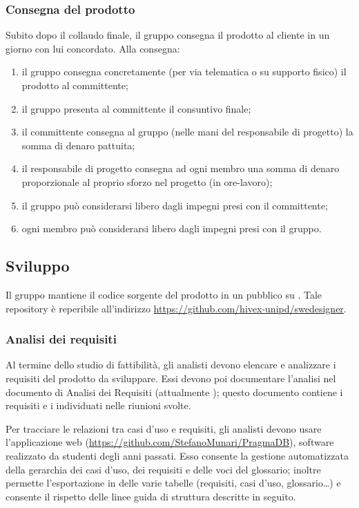 \subsubsection{Consegna del prodotto}
Subito dopo il collaudo finale, il gruppo consegna il prodotto al cliente in un giorno con lui concordato. Alla consegna:
\begin{enumerate}
	\item il gruppo consegna concretamente (per via telematica o su supporto fisico) il prodotto al committente;
	\item il gruppo presenta al committente il consuntivo finale;
	\item il committente consegna al gruppo (nelle mani del responsabile di progetto) la somma di denaro pattuita;
	\item il responsabile di progetto consegna ad ogni membro una somma di denaro proporzionale al proprio sforzo nel progetto (in ore-lavoro);
	\item il gruppo può considerarsi libero dagli impegni presi con il committente;
	\item ogni membro può considerarsi libero dagli impegni presi con il gruppo.
\end{enumerate}


\subsection{Sviluppo}
Il gruppo mantiene il codice sorgente del prodotto in un  pubblico su . Tale repository è reperibile all'indirizzo \url{https://github.com/hivex-unipd/swedesigner}.

\subsubsection{Analisi dei requisiti}
Al termine dello studio di fattibilità, gli analisti devono elencare e analizzare i requisiti del prodotto da sviluppare. Essi devono poi documentare l'analisi nel documento di Analisi dei Requisiti (attualmente \AdR); questo documento contiene i requisiti e i  individuati nelle riunioni svolte.

Per tracciare le relazioni tra casi d'uso e requisiti, gli analisti devono usare l'applicazione web  (\url{https://github.com/StefanoMunari/PragmaDB}), software realizzato da studenti degli anni passati. Esso consente la gestione automatizzata della gerarchia dei casi d'uso, dei requisiti e delle voci del glossario; inoltre permette l'esportazione in  delle varie tabelle (requisiti, casi d'uso, glossario\dots) e consente il rispetto delle linee guida di struttura descritte in seguito.

